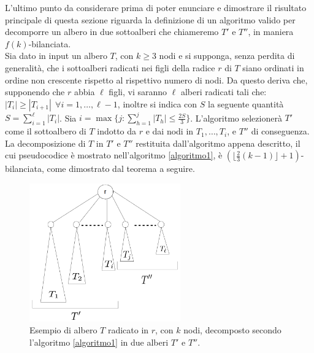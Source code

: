 L'ultimo punto da considerare prima di poter enunciare e dimostrare il risultato principale di questa sezione riguarda la definizione di un algoritmo valido per decomporre un albero in due sottoalberi che chiameremo $ T' $ e $ T'' $, in maniera $ f(k) $-bilanciata.\\
Sia dato in input un albero $ T $, con $ k\ge 3 $ nodi e
si supponga, senza perdita di generalit\`a, che i sottoalberi radicati nei figli della radice $ r $ di $ T $ siano ordinati in ordine non crescente rispetto al rispettivo numero di nodi.
Da questo deriva che, supponendo che $ r $ abbia $ \ell $ figli, vi saranno $ \ell $ alberi radicati tali che: $ |T_{i}|\ge |T_{i+1}| \ \  \forall {i = 1,\dots, \ell-1} $, inoltre si indica con $ S $ la seguente quantit\`a $ S=\sum_{i=1}^{\ell}|T_i| $.
Sia $i = \max \{ j : \sum_{h=1}^{j} |T_h| \le \frac{2 S}{3} \}$. L'algoritmo selezionerà $T'$ come il sottoalbero di $T$ indotto da $r$ e dai nodi in $T_1, \dots, T_i$, e $T''$ di conseguenza.
La decomposizione di $T$ in $T'$ e $T''$ restituita dall'algoritmo appena descritto, il cui pseudocodice è mostrato nell'algoritmo \ref{algoritmo1}, è $ (\lfloor \frac{2}{3}(k-1) \rfloor + 1)$-bilanciata, come dimostrato dal teorema a seguire.

	\begin{figure}[htbp]
	\centering
	\includegraphics[width=6.5cm]{capitolo3/grafo4}
	\caption{Esempio di albero $ T $ radicato in $ r $, con $ k $ nodi, decomposto secondo l'algoritmo \ref{algoritmo1} in due alberi $ T' $ e $ T'' $.}
	\label{fig:3} 
\end{figure}

